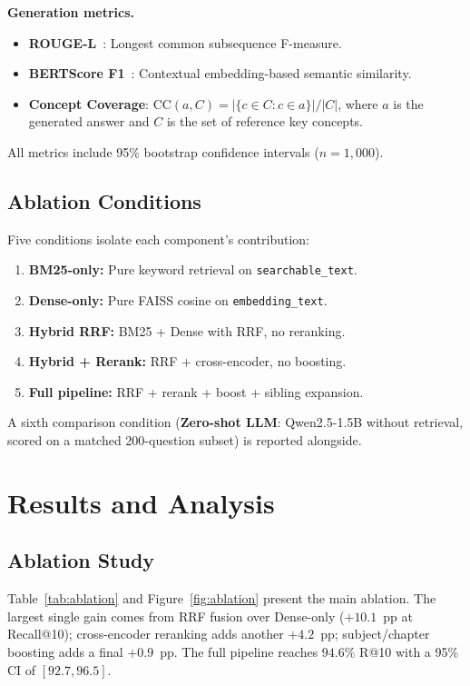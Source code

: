 \documentclass[conference]{IEEEtran}
\begin{document}
\textbf{Generation metrics.}
\begin{itemize}
    \item \textbf{ROUGE-L}~\cite{lin2004rouge}: Longest common subsequence F-measure.
    \item \textbf{BERTScore F1}~\cite{zhang2019bertscore}: Contextual embedding-based semantic similarity.
    \item \textbf{Concept Coverage}: $\mathrm{CC}(a, C) = |\{c \in C : c \in a\}| / |C|$, where $a$ is the generated answer and $C$ is the set of reference key concepts.
\end{itemize}

All metrics include 95\% bootstrap confidence intervals ($n = 1{,}000$).

\subsection{Ablation Conditions}
Five conditions isolate each component's contribution:
\begin{enumerate}
    \item \textbf{BM25-only:} Pure keyword retrieval on \texttt{searchable\_text}.
    \item \textbf{Dense-only:} Pure FAISS cosine on \texttt{embedding\_text}.
    \item \textbf{Hybrid RRF:} BM25 + Dense with RRF, no reranking.
    \item \textbf{Hybrid + Rerank:} RRF + cross-encoder, no boosting.
    \item \textbf{Full pipeline:} RRF + rerank + boost + sibling expansion.
\end{enumerate}
A sixth comparison condition (\textbf{Zero-shot LLM}: Qwen2.5-1.5B without retrieval, scored on a matched 200-question subset) is reported alongside.

\section{Results and Analysis}\label{sec:results}

\subsection{Ablation Study}\label{sec:ablation}
Table~\ref{tab:ablation} and Figure~\ref{fig:ablation} present the main ablation. The largest single gain comes from RRF fusion over Dense-only ($+10.1$~pp at Recall@10); cross-encoder reranking adds another $+4.2$~pp; subject/chapter boosting adds a final $+0.9$~pp. The full pipeline reaches $94.6\%$ R@10 with a 95\% CI of $[92.7, 96.5]$.
\end{document}
